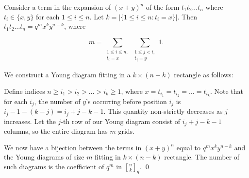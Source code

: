 \documentclass[12pt]{article}
\newcommand{\qbinom}{\genfrac{[}{]}{0pt}{}}
\begin{document}
Consider a term in the expansion of $(x+y)^n$ of the form $t_1t_2\hdots t_n$ where $t_i\in \{x,y\}$ for each
$1\le i\le n$. Let $k=|\{1\le i\le n: t_i=x\}|$. 
Then $t_1t_2\hdots t_n=q^m x^k y^{n-k}$, where 

$$m=\sum_{\substack{1\le i\le n,\\ t_i=x}}
\sum_{\substack{1\le j<i,\\ t_j=y}} 1.$$

We construct a Young diagram fitting in a $k\times (n-k)$ rectangle as follows:

Define indices $n\ge i_1 > i_2 > \hdots > i_k\ge1$, where $x=t_{i_1}=t_{i_2}=\hdots=t_{i_k}$.
Note that for each $i_j$, the number of $y$'s occurring before position $i_j$ is $i_j-1-(k-j)=i_j+j-k-1$. This quantity non-strictly decreases as $j$ increases. Let the $j$-th row  of our Young diagram consist of $i_j+j-k-1$ columns, so the entire diagram has $m$ grids.

We now have a bijection between the terms in $(x+y)^n$ equal to $q^mx^ky^{n-k}$ and the Young diagrams of size $m$ fitting in $k\times(n-k)$ rectangle. The number  of such diagrams is the coefficient of $q^m$ in $\qbinom{n}{k}_q$. \qed
\end{document}
